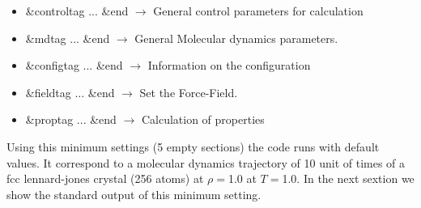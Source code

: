 \documentclass[a4paper]{article}
\begin{document}
\begin{itemize}
\item \&controltag ... \&end $\rightarrow$ General control parameters for calculation 
\item \&mdtag ... \&end      $\rightarrow$ General Molecular dynamics parameters.
\item \&configtag ... \&end  $\rightarrow$ Information on the configuration
\item \&fieldtag ... \&end   $\rightarrow$ Set the Force-Field.
\item \&proptag ... \&end    $\rightarrow$ Calculation of properties
\end{itemize}

Using this minimum settings (5 empty sections) the code runs with default values.
It correspond to a molecular dynamics trajectory of 10 unit of times of a fcc lennard-jones 
crystal (256 atoms) at $\rho=$1.0 at $T=$1.0. In the next sextion we show the standard output of this minimum setting. 

\clearpage
\end{document}
